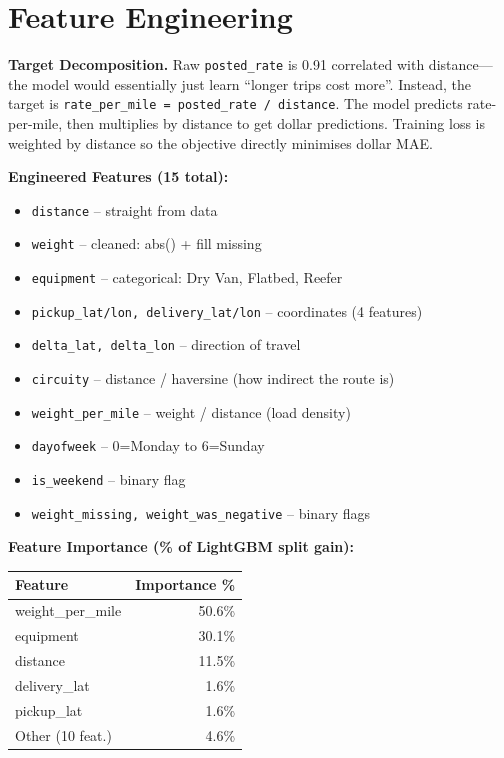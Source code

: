 \documentclass[11pt,a4paper]{article}
\begin{document}
\section{Feature Engineering}

\textbf{Target Decomposition.}
Raw \texttt{posted\_rate} is 0.91 correlated with distance---the model would essentially just learn
``longer trips cost more''. Instead, the target is \texttt{rate\_per\_mile = posted\_rate / distance}.
The model predicts rate-per-mile, then multiplies by distance to get dollar predictions.
Training loss is weighted by distance so the objective directly minimises dollar MAE.

\textbf{Engineered Features (15 total):}
\begin{itemize}[leftmargin=1.5em]
  \item \texttt{distance} -- straight from data
  \item \texttt{weight} -- cleaned: abs() + fill missing
  \item \texttt{equipment} -- categorical: Dry Van, Flatbed, Reefer
  \item \texttt{pickup\_lat/lon, delivery\_lat/lon} -- coordinates (4 features)
  \item \texttt{delta\_lat, delta\_lon} -- direction of travel
  \item \texttt{circuity} -- distance / haversine (how indirect the route is)
  \item \texttt{weight\_per\_mile} -- weight / distance (load density)
  \item \texttt{dayofweek} -- 0=Monday to 6=Sunday
  \item \texttt{is\_weekend} -- binary flag
  \item \texttt{weight\_missing, weight\_was\_negative} -- binary flags
\end{itemize}

\textbf{Feature Importance (\% of LightGBM split gain):}
\begin{table}[h]
\centering
\begin{tabular}{lr}
\toprule
\textbf{Feature} & \textbf{Importance \%} \\
\midrule
weight\_per\_mile & 50.6\% \\
equipment        & 30.1\% \\
distance         & 11.5\% \\
delivery\_lat    &  1.6\% \\
pickup\_lat      &  1.6\% \\
Other (10 feat.) &  4.6\% \\
\bottomrule
\end{tabular}
\end{table}
\end{document}

